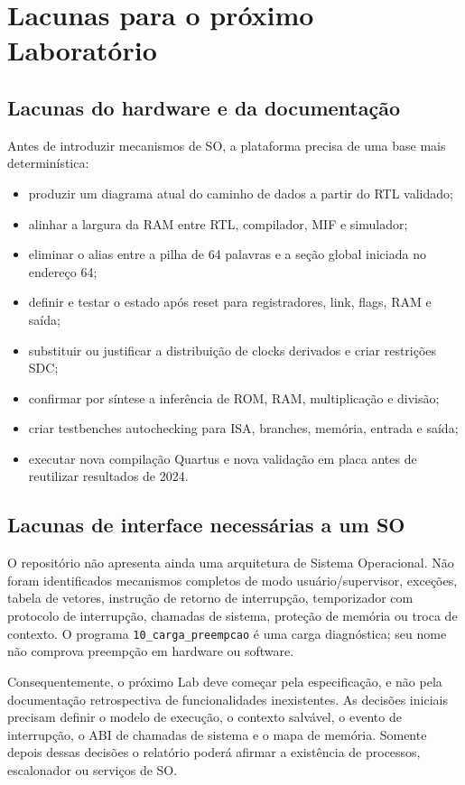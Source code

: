 \documentclass[
  12pt,
  oneside,
  a4paper,
  english,
  french,
  spanish,
  brazilian,
]{abntex2}
\begin{document}
\chapter{Lacunas para o próximo Laboratório}
\label{cap:lacunas}

\section{Lacunas do hardware e da documentação}

Antes de introduzir mecanismos de SO, a plataforma precisa de uma base mais determinística:
\begin{itemize}
  \item produzir um diagrama atual do caminho de dados a partir do RTL validado;
  \item alinhar a largura da RAM entre RTL, compilador, MIF e simulador;
  \item eliminar o alias entre a pilha de 64 palavras e a seção global iniciada no endereço 64;
  \item definir e testar o estado após reset para registradores, link, flags, RAM e saída;
  \item substituir ou justificar a distribuição de clocks derivados e criar restrições SDC;
  \item confirmar por síntese a inferência de ROM, RAM, multiplicação e divisão;
  \item criar testbenches autochecking para ISA, branches, memória, entrada e saída;
  \item executar nova compilação Quartus e nova validação em placa antes de reutilizar resultados de 2024.
\end{itemize}

\section{Lacunas de interface necessárias a um SO}

O repositório não apresenta ainda uma arquitetura de Sistema Operacional. Não foram identificados mecanismos completos de modo usuário/supervisor, exceções, tabela de vetores, instrução de retorno de interrupção, temporizador com protocolo de interrupção, chamadas de sistema, proteção de memória ou troca de contexto. O programa \texttt{10\_carga\_preempcao} é uma carga diagnóstica; seu nome não comprova preempção em hardware ou software.

Consequentemente, o próximo Lab deve começar pela especificação, e não pela documentação retrospectiva de funcionalidades inexistentes. As decisões iniciais precisam definir o modelo de execução, o contexto salvável, o evento de interrupção, o ABI de chamadas de sistema e o mapa de memória. Somente depois dessas decisões o relatório poderá afirmar a existência de processos, escalonador ou serviços de SO.
\end{document}
